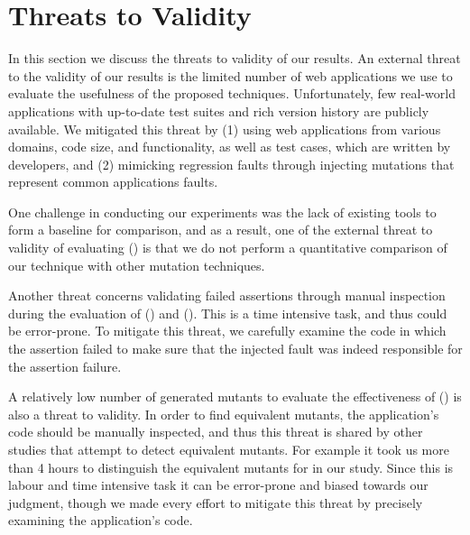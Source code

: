 \section{Threats to Validity}
In this section we discuss the threats to validity of our results.
An external threat to the validity of our results is the limited number 
of web applications we use to evaluate the usefulness of the proposed techniques.
Unfortunately, few real-world \javascript applications with up-to-date test suites and rich version history are publicly available. We mitigated this threat by (1) using web applications from various domains, code size, and functionality, as well as \selenium test cases, which are written by developers, and (2) mimicking regression faults through injecting mutations that represent common \javascript applications faults.

One challenge in conducting our experiments was the lack of existing \javascript tools to form a baseline for comparison, and as a result, one of the external threat to validity of evaluating \mutandis () is that we do not perform a quantitative comparison 
of our technique with other mutation techniques.

Another threat concerns validating failed assertions through manual inspection during the evaluation of \jseft () and \atrina (). This is a time intensive task, and thus could be error-prone. To mitigate this threat, we carefully examine the code in which the assertion failed to make sure that the injected fault was indeed responsible for the assertion failure.

A relatively low number of generated mutants to evaluate the effectiveness of \mutandis () is also a threat to validity. 
In order to find equivalent mutants, the application's code should be manually inspected, and thus this threat is shared by other studies that attempt to detect equivalent mutants.
For example it took us more than 4 hours to distinguish the equivalent mutants for \jquery in our study. Since this is labour and time intensive task it can be error-prone and biased towards our judgment, though we made every effort to mitigate this threat by precisely examining the application's code. 





